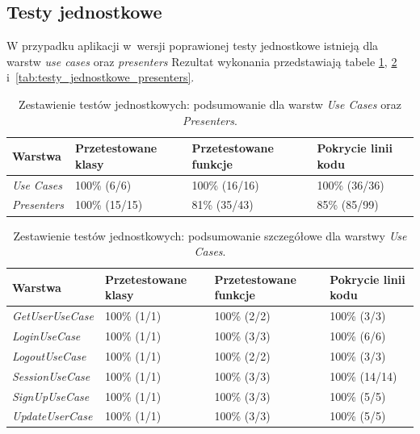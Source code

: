 \subsection{Testy jednostkowe}
W przypadku aplikacji w~wersji poprawionej testy jednostkowe istnieją dla warstw \textit{use cases} oraz \textit{presenters} Rezultat wykonania przedstawiają tabele \ref{tab:testy_jednostkowe_razem}, \ref{tab:testy_jednostkowe_usecases} i~\ref{tab:testy_jednostkowe_presenters}.
\begin{table}[!htb]
\centering
\caption{Zestawienie testów jednostkowych: podsumowanie dla warstw \textit{Use Cases} oraz \textit{Presenters}.}
\label{tab:testy_jednostkowe_razem}
\begin{tabular}{|p{5.8cm}|p{3cm}|p{3cm}|p{3cm}|}
\hline
\textbf{Warstwa} & \textbf{Przetestowane klasy} & \textbf{Przetestowane funkcje} & \textbf{Pokrycie linii kodu} \\ \hline
\textit{Use Cases} & 100\% (6/6) & 100\% (16/16) & 100\% (36/36)	\\ \hline
\textit{Presenters} & 100\% (15/15)	& 81\% (35/43) & 85\% (85/99) \\ \hline
\end{tabular}
\end{table}

\begin{table}[!htb]
\centering
\caption{Zestawienie testów jednostkowych: podsumowanie szczegółowe dla warstwy \textit{Use Cases}.}
\label{tab:testy_jednostkowe_usecases}
\begin{tabular}{|p{5.8cm}|p{3cm}|p{3cm}|p{3cm}|}
\hline
\textbf{Warstwa} & \textbf{Przetestowane klasy} & \textbf{Przetestowane funkcje} & \textbf{Pokrycie linii kodu} \\ \hline
\textit{GetUserUseCase} & 100\% (1/1) & 100\% (2/2) & 100\% (3/3)	\\ \hline
\textit{LoginUseCase} & 100\% (1/1) & 100\% (3/3) & 100\% (6/6)	\\ \hline
\textit{LogoutUseCase} & 100\% (1/1) & 100\% (2/2) & 100\% (3/3)	\\ \hline
\textit{SessionUseCase} & 100\% (1/1) & 100\% (3/3) & 100\% (14/14)	\\ \hline
\textit{SignUpUseCase} & 100\% (1/1) & 100\% (3/3) & 100\% (5/5)	\\ \hline
\textit{UpdateUserCase} & 100\% (1/1) & 100\% (3/3) & 100\% (5/5)	\\ \hline
\end{tabular}
\end{table}

